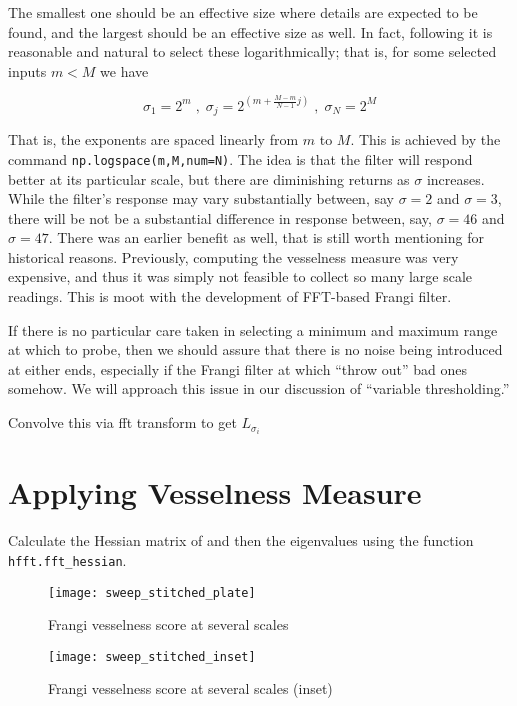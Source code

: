 	The smallest one should be an effective size where details are expected to be found, and the largest should be an effective size as well. In fact, following \cite{Koenderink} it is reasonable and natural to select these logarithmically; that is,
	for some selected inputs $m < M$ we have
	
	\begin{equation}
	\sigma_1 = 2^{m} \; , \; \sigma_{j} = 2^{\left(m+\frac{M-m}{N-1}j\right)} \; , \; \sigma_N = 2^{M} \end{equation}
	
	That is, the exponents are spaced linearly from $m$ to $M$. This is achieved by the command
	\texttt{np.logspace(m,M,num=N)}. The idea is that the filter will respond better at its particular scale, but there are diminishing returns as $\sigma$ increases. While the filter's response may vary substantially between, say $\sigma=2$ and $\sigma=3$, there will be not be a substantial difference in response between, say, $\sigma=46$ and $\sigma=47$. There was an earlier benefit as well, that is still worth mentioning for historical reasons. Previously, computing the vesselness measure was very expensive, and thus it was simply not feasible to collect so many large scale readings. This is moot with the development of FFT-based Frangi filter.
	
	If there is no particular care taken in selecting a minimum and maximum range at which to probe, then we should assure that there is no noise being introduced at either ends, especially if the Frangi filter at which   ``throw out'' bad ones somehow. We will approach this issue in our discussion of ``variable thresholding.''
	
	
	
	
	
	Convolve this via fft transform to get $L_{\sigma_i}$
	

\section{Applying Vesselness Measure}
Calculate the Hessian matrix of  and then the eigenvalues using the function \texttt{hfft.fft\_hessian}.

\begin{figure}
	\texttt{[image: sweep\_stitched\_plate]}
	\caption{Frangi vesselness score at several scales}
\end{figure}
\begin{figure}
	\texttt{[image: sweep\_stitched\_inset]}
	\caption{Frangi vesselness score at several scales (inset)}
\end{figure}
